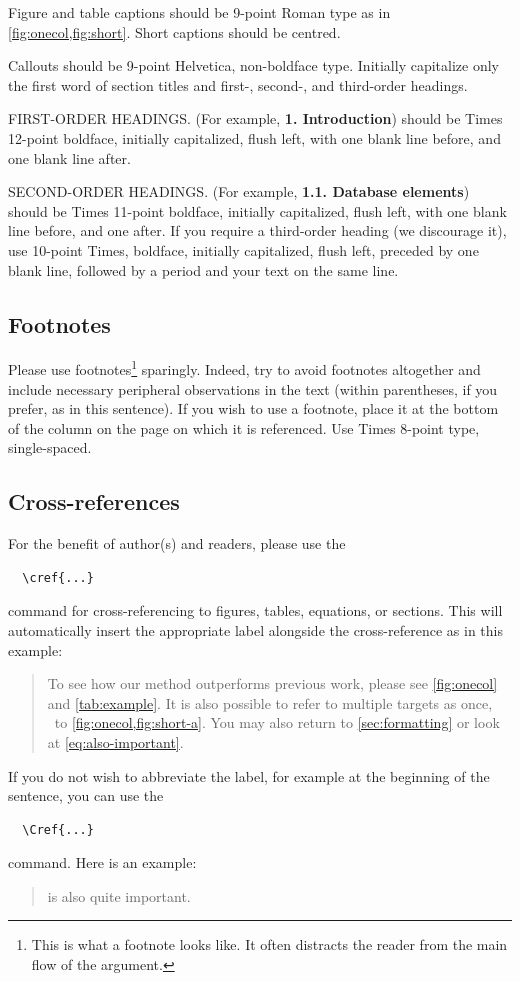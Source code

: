 \documentclass[10pt,twocolumn,letterpaper]{article}
\begin{document}
Figure and table captions should be 9-point Roman type as in \cref{fig:onecol,fig:short}.
Short captions should be centred.

\noindent Callouts should be 9-point Helvetica, non-boldface type.
Initially capitalize only the first word of section titles and first-, second-, and third-order headings.

FIRST-ORDER HEADINGS.
(For example, {\large \bf 1. Introduction}) should be Times 12-point boldface, initially capitalized, flush left, with one blank line before, and one blank line after.

SECOND-ORDER HEADINGS.
(For example, { \bf 1.1. Database elements}) should be Times 11-point boldface, initially capitalized, flush left, with one blank line before, and one after.
If you require a third-order heading (we discourage it), use 10-point Times, boldface, initially capitalized, flush left, preceded by one blank line, followed by a period and your text on the same line.

\subsection{Footnotes}

Please use footnotes\footnote{This is what a footnote looks like.
It often distracts the reader from the main flow of the argument.} sparingly.
Indeed, try to avoid footnotes altogether and include necessary peripheral observations in the text (within parentheses, if you prefer, as in this sentence).
If you wish to use a footnote, place it at the bottom of the column on the page on which it is referenced.
Use Times 8-point type, single-spaced.


\subsection{Cross-references}

For the benefit of author(s) and readers, please use the
{\small\begin{verbatim}
  \cref{...}
\end{verbatim}}  command for cross-referencing to figures, tables, equations, or sections.
This will automatically insert the appropriate label alongside the cross-reference as in this example:
\begin{quotation}
  To see how our method outperforms previous work, please see \cref{fig:onecol} and \cref{tab:example}.
  It is also possible to refer to multiple targets as once, \eg~to \cref{fig:onecol,fig:short-a}.
  You may also return to \cref{sec:formatting} or look at \cref{eq:also-important}.
\end{quotation}
If you do not wish to abbreviate the label, for example at the beginning of the sentence, you can use the
{\small\begin{verbatim}
  \Cref{...}
\end{verbatim}}
command. Here is an example:
\begin{quotation}
   is also quite important.
\end{quotation}
\end{document}

